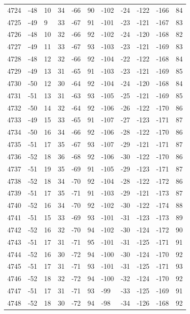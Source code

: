 \begin{table}[H]
\begin{tabular}{lllllllllll}
4724 & -48 & 10 & 34 & -66 & 90 & -102 & -24 & -122 & -166 & 84 \\
4725 & -49 & 9 & 33 & -67 & 91 & -101 & -23 & -121 & -167 & 83 \\
4726 & -48 & 10 & 32 & -66 & 92 & -102 & -24 & -120 & -168 & 82 \\
4727 & -49 & 11 & 33 & -67 & 93 & -103 & -23 & -121 & -169 & 83 \\
4728 & -48 & 12 & 32 & -66 & 92 & -104 & -22 & -122 & -168 & 84 \\
4729 & -49 & 13 & 31 & -65 & 91 & -103 & -23 & -121 & -169 & 85 \\
4730 & -50 & 12 & 30 & -64 & 92 & -104 & -24 & -120 & -168 & 84 \\
4731 & -51 & 13 & 31 & -63 & 93 & -105 & -25 & -121 & -169 & 85 \\
4732 & -50 & 14 & 32 & -64 & 92 & -106 & -26 & -122 & -170 & 86 \\
4733 & -49 & 15 & 33 & -65 & 91 & -107 & -27 & -123 & -171 & 87 \\
4734 & -50 & 16 & 34 & -66 & 92 & -106 & -28 & -122 & -170 & 86 \\
4735 & -51 & 17 & 35 & -67 & 93 & -107 & -29 & -121 & -171 & 87 \\
4736 & -52 & 18 & 36 & -68 & 92 & -106 & -30 & -122 & -170 & 86 \\
4737 & -51 & 19 & 35 & -69 & 91 & -105 & -29 & -123 & -171 & 87 \\
4738 & -52 & 18 & 34 & -70 & 92 & -104 & -28 & -122 & -172 & 86 \\
4739 & -51 & 17 & 35 & -71 & 91 & -103 & -29 & -121 & -173 & 87 \\
4740 & -52 & 16 & 34 & -70 & 92 & -102 & -30 & -122 & -174 & 88 \\
4741 & -51 & 15 & 33 & -69 & 93 & -101 & -31 & -123 & -173 & 89 \\
4742 & -52 & 16 & 32 & -70 & 94 & -102 & -30 & -124 & -172 & 90 \\
4743 & -51 & 17 & 31 & -71 & 95 & -101 & -31 & -125 & -171 & 91 \\
4744 & -52 & 16 & 30 & -72 & 94 & -100 & -30 & -124 & -170 & 92 \\
4745 & -51 & 17 & 31 & -71 & 93 & -101 & -31 & -125 & -171 & 93 \\
4746 & -52 & 18 & 32 & -72 & 94 & -100 & -32 & -124 & -170 & 92 \\
4747 & -51 & 17 & 31 & -71 & 93 & -99 & -33 & -125 & -169 & 91 \\
4748 & -52 & 18 & 30 & -72 & 94 & -98 & -34 & -126 & -168 & 92 \\

\end{tabular}
\end{table}
